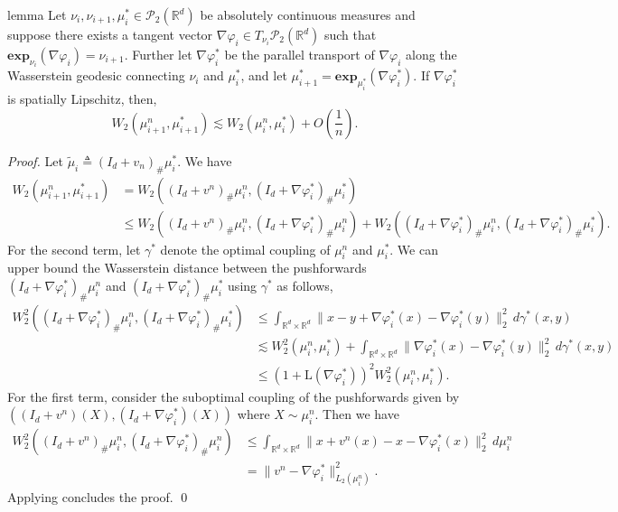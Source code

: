 \documentclass[11pt]{article}
\begin{document}
\begin{restatable}{lemma}{}
    Let $\nu_i, \nu_{i+1}, \mu_i^* \in \mathcal{P}_2(\mathbb{R}^d)$ be absolutely continuous measures and suppose there exists a tangent vector $\nabla\varphi_i \in T_{\nu_i}\mathcal{P}_2(\mathbb{R}^d)$ such that $\mathbf{exp}_{\nu_i}(\nabla\varphi_i) = \nu_{i+1}.$ Further let $\nabla \varphi^*_i$ be the parallel transport of $\nabla\varphi_i$ along the Wasserstein geodesic connecting $\nu_i$ and $\mu_i^*$, and let $\mu_{i+1}^* = \mathbf{exp}_{\mu_i^*}(\nabla\varphi^*_i)$. If $\nabla\varphi_i^*$ is spatially Lipschitz, then,
    \[W_2(\mu_{i+1}^n, \mu_{i+1}^*) \lesssim  W_2(\mu_{i}^n, \mu_i^*) + O\left(\frac{1}{n}\right).\]
\end{restatable}
\noindent \textit{Proof.} Let $\tilde\mu_i \triangleq (I_d + v_n)_\# \mu_i^*$. We have 
\begin{align*}
    W_2(\mu_{i+1}^n, \mu_{i+1}^*) &= W_2((I_d + v^n)_\#\mu_i^n, (I_d + \nabla\varphi_i^*)_\#\mu_i^*) \\
    &\leq W_2((I_d + v^n)_\#\mu_i^n, (I_d + \nabla\varphi_i^*)_\#\mu_i^n) + W_2((I_d + \nabla\varphi_i^*)_\#\mu_i^n, (I_d + \nabla \varphi_i^*)_\#\mu_i^*).
\end{align*}
For the second term, let $\gamma^*$ denote the optimal coupling of $\mu_i^n$ and $\mu_i^*$. We can upper bound the Wasserstein distance between the pushforwards $(I_d + \nabla\varphi_i^*)_\# \mu_i^n$ and $(I_d + \nabla\varphi_i^*)_\#\mu_i^*$ using $\gamma^*$ as follows,
\begin{align*}
    W_2^2((I_d + \nabla\varphi_i^*)_\#\mu_i^n, (I_d + \nabla\varphi_i^*)_\#\mu_i^*) &\leq \int_{\mathbb{R}^d \times\mathbb{R}^d} \|x - y + \nabla\varphi_i^*(x) - \nabla\varphi_i^*(y)\|_2^2\, d\gamma^*(x,y) \\
    &\lesssim  W_2^2(\mu_i^n, \mu_i^*) + \int_{\mathbb{R}^d \times\mathbb{R}^d} \|\nabla\varphi_i^*(x) - \nabla\varphi_i^*(y)\|_2^2\, d\gamma^*(x,y) \\
    &\leq (1 + \text{L}(\nabla\varphi_i^*))^2W_2^2(\mu_i^n, \mu_i^*).
\end{align*}
For the first term, consider the suboptimal coupling of the pushforwards given by $((I_d + v^n)(X), (I_d + \nabla\varphi_i^*)(X))$ where $X \sim \mu_i^n$. Then we have
\begin{align*}
    W_2^2((I_d + v^n)_\#\mu_i^n, (I_d + \nabla\varphi_i^*)_\#\mu_i^n) &\leq \int_{\mathbb{R}^d\times \mathbb{R}^d}\|x + v^n(x) - x - \nabla\varphi_i^*(x)\|_2^2 \, d\mu_i^n \\
    &= \|v^n - \nabla\varphi_i^*\|_{L_2(\mu_i^n)}^2.
\end{align*}
Applying  concludes the proof. \qed{}
\end{document}
